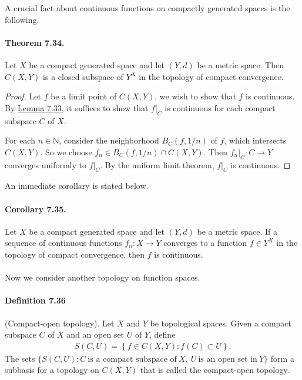 \documentclass{article}
\numberwithin{equation}{section}
\theoremstyle{plain}
\theoremstyle{definition}
\begin{document}
A crucial fact about continuous functions on compactly generated spaces is the following.

\paragraph{Theorem 7.34.\label{thm:7.34}} Let $X$ be a compact generated space and let $(Y,d)$ be a metric space. Then $C(X,Y)$ is a closed subspace of $Y^X$ in the topology of compact convergence.
\begin{proof}
Let $f$ be a limit point of $C(X,Y)$, we wish to show that $f$ is continuous. By \hyperref[lemma:7.33]{Lemma 7.33}, it suffices to show that $f|_C$ is continuous for each compact subspace $C$ of $X$.

For each $n\in\mathbb{N}$, consider the neighborhood $B_C(f,1/n)$ of $f$, which intersects $C(X,Y)$. So we choose $f_n\in B_C(f,1/n)\cap C(X,Y)$. Then $f_n|_C:C\to Y$ converges uniformly to $f|_C$. By the uniform limit theorem, $f|_C$ is continuous.
\end{proof}

An immediate corollary is stated below.

\paragraph{Corollary 7.35.\label{cor:7.35}} Let $X$ be a compact generated space and let $(Y,d)$ be a metric space. If a sequence of continuous functions $f_n:X\to Y$ converges to a function $f\in Y^X$ in the topology of compact convergence, then $f$ is continuous.

\paragraph{} Now we consider another topology on function spaces.

\paragraph{Definition 7.36\label{def:7.36}} (Compact-open topology). Let $X$ and $Y$ be topological spaces. Given a compact subspace $C$ of $X$ and an open set $U$ of $Y$, define
\begin{align*}
	S(C,U) = \left\{f\in C(X,Y):f(C)\subset U\right\}.
\end{align*}
The sets $\{S(C,U):C\ \text{is a compact subspace of}\ X,\ U\ \text{is an open set in}\ Y\}$ form a subbasis for a topology on $C(X,Y)$ that is called the compact-open topology.
\end{document}

